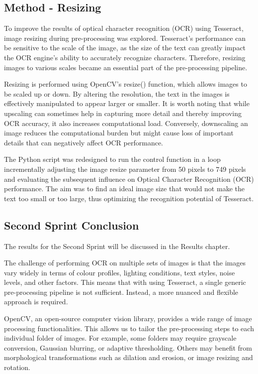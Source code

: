 \subsection*{Method - Resizing}

To improve the results of optical character recognition (OCR) using Tesseract, image resizing during pre-processing was explored. Tesseract's performance can be sensitive to the scale of the image, as the size of the text can greatly impact the OCR engine's ability to accurately recognize characters. Therefore, resizing images to various scales became an essential part of the pre-processing pipeline.

Resizing is performed using OpenCV's resize() function, which allows images to be scaled up or down. By altering the resolution, the text in the images is effectively manipulated to appear larger or smaller. It is worth noting that while upscaling can sometimes help in capturing more detail and thereby improving OCR accuracy, it also increases computational load. Conversely, downscaling an image reduces the computational burden but might cause loss of important details that can negatively affect OCR performance. \cite{dasCovid19FaceMask2020}


The Python script was redesigned to run the control function in a loop incrementally adjusting the image resize parameter from 50 pixels to 749 pixels and evaluating the subsequent influence on Optical Character Recognition (OCR) performance. The aim was to find an ideal image size that would not make the text too small or too large, thus optimizing the recognition potential of Tesseract.


\subsection{Second Sprint Conclusion}

The results for the Second Sprint will be discussed in the Results chapter.

The challenge of performing OCR on multiple sets of images is that the images vary widely in terms of colour profiles, lighting conditions, text styles, noise levels, and other factors. This means that with using Tesseract, a single generic pre-processing pipeline is not sufficient. Instead, a more nuanced and flexible approach is required.

OpenCV, an open-source computer vision library, provides a wide range of image processing functionalities. This allows us to tailor the pre-processing steps to each individual folder of images. For example, some folders may require grayscale conversion, Gaussian blurring, or adaptive thresholding. Others may benefit from morphological transformations such as dilation and erosion, or image resizing and rotation.

